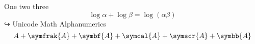 \documentclass[a4paper]{article}
\begin{document}
 One two three
 \[
 \log \alpha + \log \beta = \log(\alpha\beta)
 \]
 ↪
 Unicode Math Alphanumerics
 \[A + \symfrak{A}+\symbf{A}+ \symcal{A} + \symscr{A}+
 \symbb{A}\]
 
\end{document}
